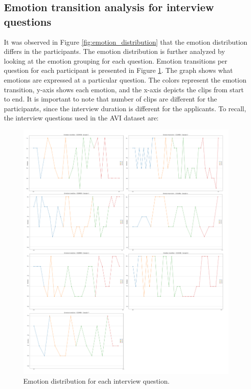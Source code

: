\subsection{Emotion transition analysis for interview questions}
It was observed in Figure \ref{fig:emotion_distribution} that the emotion distribution differs in the participants. The emotion distribution is further analyzed by looking at the emotion grouping for each question. Emotion transitions per question for each participant is presented in Figure \ref{fig:emotion_transition_questions}. The graph shows what emotions are expressed at a particular question. The colors represent the emotion transition, y-axis shows each emotion, and the x-axis depicts the clips from start to end. It is important to note that number of clips are different for the participants, since the interview duration is different for the applicants. To recall, the interview questions used in the AVI dataset are:
%
\begin{figure}[h]
  \centering
  \includegraphics[width=\textwidth]{figures/emotion_transition_questions.png}
  \caption{Emotion distribution for each interview question.}
  \label{fig:emotion_transition_questions}
\end{figure}
